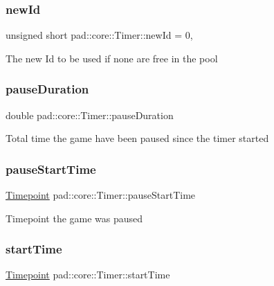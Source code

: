 \subsubsection{\texorpdfstring{new\+Id}{newId}}
{\footnotesize\ttfamily unsigned short pad\+::core\+::\+Timer\+::new\+Id = 0\hspace{0.3cm}{\ttfamily [static]}, {\ttfamily [private]}}

The new Id to be used if none are free in the pool \mbox{\label{classpad_1_1core_1_1_timer_a4c374309dd4560bb3203c79d5f41036c}} 
\subsubsection{\texorpdfstring{pause\+Duration}{pauseDuration}}
{\footnotesize\ttfamily double pad\+::core\+::\+Timer\+::pause\+Duration\hspace{0.3cm}{\ttfamily [private]}}

Total time the game have been paused since the timer started \mbox{\label{classpad_1_1core_1_1_timer_a0cbad14aa307f3c039b0ac15c239078d}} 
\subsubsection{\texorpdfstring{pause\+Start\+Time}{pauseStartTime}}
{\footnotesize\ttfamily \mbox{\hyperlink{namespacepad_1_1core_a4359864da05f393ed6e69d9d018946ad}{Timepoint}} pad\+::core\+::\+Timer\+::pause\+Start\+Time\hspace{0.3cm}{\ttfamily [private]}}

Timepoint the game was paused \mbox{\label{classpad_1_1core_1_1_timer_afe9926da78b47b4c3d33fab3632903a5}} 
\subsubsection{\texorpdfstring{start\+Time}{startTime}}
{\footnotesize\ttfamily \mbox{\hyperlink{namespacepad_1_1core_a4359864da05f393ed6e69d9d018946ad}{Timepoint}} pad\+::core\+::\+Timer\+::start\+Time\hspace{0.3cm}{\ttfamily [private]}}

